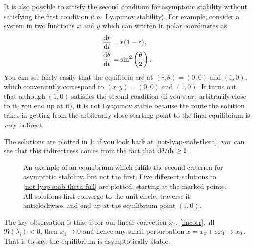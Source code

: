\documentclass[main.tex]{subfiles}
\begin{document}
\begin{nem}
It is also possible to satisfy the second condition for asymptotic stability without satisfying the first condition (i.e.\ Lyapunov stability). For example, consider a system in two functions $x$ and $y$ which can written in polar coordinates as
\begin{subequations}\label{not-lyap-stab-theta-full}%
\begin{align}
	\fd{r}{t} &= r(1-r), \\
	\fd{\theta}{t} &= \sin^2\left(\frac{\theta}{2}\right). \label{not-lyap-stab-theta}
\end{align}
\end{subequations}
You can see fairly easily that the equilibria are at $(r,\theta) = (0,0)$ and $(1,0)$, which conveniently correspond to $(x,y) = (0,0)$ and $(1,0)$. It turns out that although $(1,0)$ satisfies the second condition (if you start arbitrarily close to it, you end up at it), it is not Lyapunov stable because the route the solution takes in getting from the arbitrarily-close starting point to the final equilibrium is very indirect.

The solutions are plotted in \cref{fig:not-liapunov-stable}: if you look back at \cref{not-lyap-stab-theta}, you can see that this indirectness comes from the fact that $\fd{\theta}{t} \geq 0$.
\end{nem}
\begin{figure}
\centering

\caption{An example of an equilibrium which fulfils the second criterion for asymptotic stability, but not the first. Five different solutions to \cref{not-lyap-stab-theta-full} are plotted, starting at the marked points. All solutions first converge to the unit circle, traverse it anticlockwise, and end up at the equilibrium point $(1,0)$.}
\label{fig:not-liapunov-stable}
\end{figure}

The key observation is this: if for our linear correction $x_1$, \cref{lincorr}, all $\Re(\lambda_i)<0$, then $x_1 \to 0$ and hence any small perturbation $x=x_0 +\varepsilon x_1 \to x_0$. That is to say, the equilibrium is asymptotically stable. 

\end{document}
